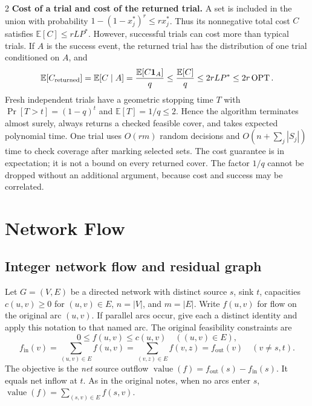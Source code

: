 \documentclass[8pt]{extarticle}
\theoremstyle{definition}
\newcommand{\OPT}{\operatorname{OPT}}
\begin{document}
\begin{multicols*}{2}
\textbf{Cost of a trial and cost of the returned trial.}
A set is included in the union with probability
$1-(1-x_j^*)^r\le r x_j^*$. Thus its nonnegative total cost $C$ satisfies
$\mathbb E[C]\le rLP^*$. However, successful trials can cost more than
typical trials. If $A$ is the success event, the returned trial has the
distribution of one trial conditioned on $A$, and
\[
  \mathbb E[C_{\rm returned}]
    =\mathbb E[C\mid A]
    =\frac{\mathbb E[C\mathbf 1_A]}q
    \le\frac{\mathbb E[C]}q
    \le2rLP^*\le2r\OPT.
\]
Fresh independent trials have a geometric stopping time $T$ with
$\Pr[T>t]=(1-q)^t$ and $\mathbb E[T]=1/q\le2$. Hence the algorithm
terminates almost surely, always returns a checked feasible cover, and
takes expected polynomial time. One trial uses $O(rm)$ random decisions
and $O(n+\sum_j|S_j|)$ time to check coverage after marking selected sets.
The cost guarantee is in expectation; it is not a bound on every returned
cover. The factor $1/q$ cannot be dropped without an additional argument,
because cost and success may be correlated.

\section{Network Flow}\label{nf:chapter}

\subsection{Integer network flow and residual graph}\label{nf:model}
Let $G=(V,E)$ be a directed network with distinct source $s$, sink $t$,
capacities $c(u,v)\ge0$ for $(u,v)\in E$, $n=|V|$, and $m=|E|$.
Write $f(u,v)$ for flow on the original arc $(u,v)$. If parallel arcs occur,
give each a distinct identity and apply this notation to that named arc.
The original feasibility constraints are
\[
  0\le f(u,v)\le c(u,v)\quad((u,v)\in E),
\]
\[
  f_{\mathrm{in}}(v)=\sum_{(u,v)\in E}f(u,v)
  =\sum_{(v,z)\in E}f(v,z)=f_{\mathrm{out}}(v)
  \quad(v\ne s,t).
\]
The objective is the \emph{net} source outflow
$\operatorname{value}(f)=f_{\mathrm{out}}(s)-f_{\mathrm{in}}(s)$.
It equals net inflow at $t$. As in the original notes, when no arcs enter
$s$, $\operatorname{value}(f)=\sum_{(s,v)\in E}f(s,v)$.


\end{multicols*}
\end{document}
